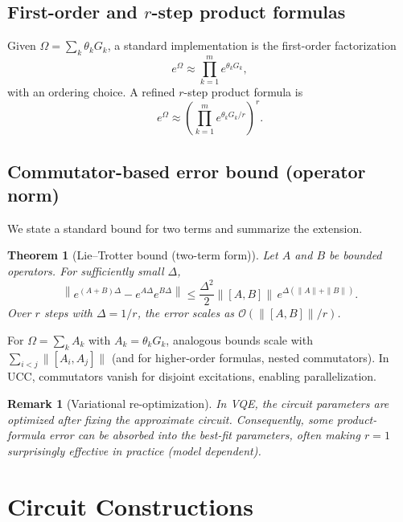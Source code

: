 \documentclass[11pt]{article}
\newtheorem{theorem}{Theorem}[section]
\newtheorem{remark}{Remark}[section]
\begin{document}
\subsection{First-order and $r$-step product formulas}
Given $\Omega=\sum_k \theta_k G_k$, a standard implementation is the first-order factorization
\begin{equation}
  e^{\Omega}\approx \prod_{k=1}^{m} e^{\theta_k G_k},
  \label{eq:trotter1}
\end{equation}
with an ordering choice.
A refined $r$-step product formula is
\begin{equation}
  e^{\Omega}\approx \left(\prod_{k=1}^{m}e^{\theta_k G_k/r}\right)^r .
  \label{eq:trotterr}
\end{equation}

\subsection{Commutator-based error bound (operator norm)}
We state a standard bound for two terms and summarize the extension.
\begin{theorem}[Lie--Trotter bound (two-term form)]
  Let $A$ and $B$ be bounded operators. For sufficiently small $\Delta$,
  \begin{equation}
    \left\|e^{(A+B)\Delta}-e^{A\Delta}e^{B\Delta}\right\|
    \le \frac{\Delta^2}{2}\|[A,B]\|\, e^{\Delta(\|A\|+\|B\|)}.
  \end{equation}
  Over $r$ steps with $\Delta=1/r$, the error scales as $\mathcal{O}(\|[A,B]\|/r)$.
\end{theorem}

For $\Omega=\sum_k A_k$ with $A_k=\theta_k G_k$, analogous bounds scale with
$\sum_{i<j}\|[A_i,A_j]\|$ (and for higher-order formulas, nested commutators).
In UCC, commutators vanish for disjoint excitations, enabling parallelization.

\begin{remark}[Variational re-optimization]
  In VQE, the circuit parameters are optimized after fixing the approximate circuit.
  Consequently, some product-formula error can be absorbed into the best-fit parameters, often making
  $r=1$ surprisingly effective in practice (model dependent).
\end{remark}

\section{Circuit Constructions}
\end{document}
